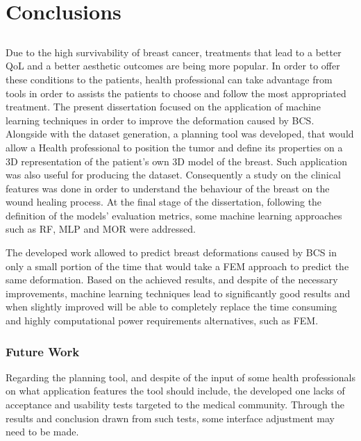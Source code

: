 \chapter{Conclusions}\label{chap:concl}

\section*{}

Due to the high survivability of breast cancer, treatments that lead to a better QoL and a better aesthetic outcomes are being more popular. In order to offer these conditions to the patients, health professional can take advantage from tools in order to assists the patients to choose and follow the most appropriated treatment.
The present dissertation focused on the application of machine learning techniques in order to improve the deformation caused by BCS. Alongside with the dataset generation, a planning tool was developed, that would allow a Health professional to position the tumor and define its properties on a 3D representation of the patient's own 3D model of the breast. Such application was also useful for producing the dataset. Consequently a study on the clinical features was done in order to understand the behaviour of the breast on the wound healing process.
At the final stage of the dissertation, following the definition of the models' evaluation metrics, some machine learning approaches such as RF, MLP and MOR were addressed.

The developed work allowed to predict breast deformations caused by BCS in only a small portion of the time that would take a FEM approach to predict the same deformation. Based on the achieved results, and despite of the necessary improvements, machine learning techniques lead to significantly good results and when slightly improved will be able to completely replace the time consuming and highly computational power requirements alternatives, such as FEM.

\subsection{Future Work}

Regarding the planning tool, and despite of the input of some health professionals on what application features the tool should include, the developed one lacks of acceptance and usability tests targeted to the medical community. Through the results and conclusion drawn from such tests, some interface adjustment may need to be made.

